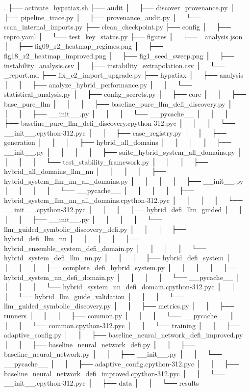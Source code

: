 .
├── activate_hypatiax.sh
├── audit
│   ├── discover_provenance.py
│   ├── pipeline_trace.py
│   ├── provenance_audit.py
│   └── scan_internal_imports.py
├── clean_checkpoint.py
├── config
│   ├── repro.yaml
│   └── test_key_status.py
├── figures
│   ├── _analysis.json
│   ├── fig09_r2_heatmap_regimes.png
│   ├── fig18_r2_heatmap_improved.png
│   ├── fig1_seed_sweep.png
│   ├── instability_analysis.csv
│   ├── instability_extrapolation.csv
│   └── _report.md
├── fix_c2_import_upgrade.py
├── hypatiax
│   ├── analysis
│   │   ├── analyze_hybrid_performance.py
│   │   └── statistical_analysis.py
│   ├── config_secrets.py
│   ├── core
│   │   ├── base_pure_llm
│   │   │   ├── baseline_pure_llm_defi_discovery.py
│   │   │   ├── __init__.py
│   │   │   └── __pycache__
│   │   │       ├── baseline_pure_llm_defi_discovery.cpython-312.pyc
│   │   │       └── __init__.cpython-312.pyc
│   │   ├── case_registry.py
│   │   ├── generation
│   │   │   ├── hybrid_all_domains
│   │   │   │   ├── __init__.py
│   │   │   │   ├── suite_hybrid_system_all_domains.py
│   │   │   │   └── test_stability_framework.py
│   │   │   ├── hybrid_all_domains_llm_nn
│   │   │   │   ├── hybrid_system_llm_nn_all_domains.py
│   │   │   │   ├── __init__.py
│   │   │   │   └── __pycache__
│   │   │   │       ├── hybrid_system_llm_nn_all_domains.cpython-312.pyc
│   │   │   │       └── __init__.cpython-312.pyc
│   │   │   ├── hybrid_defi_llm_guided
│   │   │   │   ├── __init__.py
│   │   │   │   └── llm_guided_symbolic_discovery_defi.py
│   │   │   ├── hybrid_defi_llm_nn
│   │   │   │   ├── hybrid_ensemble_system_defi_domain.py
│   │   │   │   └── hybrid_system_defi_llm_nn.py
│   │   │   ├── hybrid_defi_system
│   │   │   │   ├── complete_defi_hybrid_system.py
│   │   │   │   ├── hybrid_system_nn_defi_domain.py
│   │   │   │   └── __pycache__
│   │   │   │       └── hybrid_system_nn_defi_domain.cpython-312.pyc
│   │   │   └── hybrid_llm_guide_validation
│   │   │       └── llm_guided_symbolic_discovery.py
│   │   ├── metrics.py
│   │   ├── runners
│   │   │   ├── common.py
│   │   │   └── __pycache__
│   │   │       └── common.cpython-312.pyc
│   │   └── training
│   │       ├── adaptive_config.py
│   │       ├── baseline_neural_network_defi_improved.py
│   │       ├── baseline_neural_network_defi.py
│   │       ├── baseline_neural_network.py
│   │       ├── __init__.py
│   │       └── __pycache__
│   │           ├── adaptive_config.cpython-312.pyc
│   │           ├── baseline_neural_network_defi_improved.cpython-312.pyc
│   │           └── __init__.cpython-312.pyc
│   ├── data
│   │   └── results
